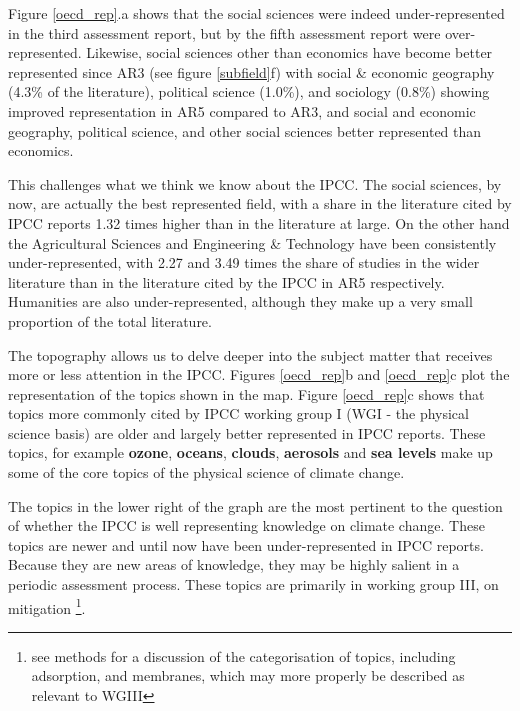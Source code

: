 \documentclass{article}
\begin{document}
\begin{linenumbers}
		Figure \ref{oecd_rep}.a shows that the social sciences were indeed under-represented in the third assessment report, but by the fifth assessment report were over-represented. Likewise, social sciences other than economics have become better represented since AR3  (see figure \ref{subfield}f) with social \& economic geography (4.3\% of the literature), political science (1.0\%), and sociology (0.8\%) showing improved representation in AR5 compared to AR3, and social and economic geography, political science, and other social sciences better represented than economics. 
		
		This challenges what we think we know about the IPCC. The social sciences, by now, are actually the best represented field, with a share in the literature cited by IPCC reports 1.32 times higher than in the literature at large.  On the other hand the Agricultural Sciences and Engineering \& Technology have been consistently under-represented, with 2.27 and 3.49 times the share of studies in the wider literature than in the literature cited by the IPCC in AR5 respectively. Humanities are also under-represented, although they make up a very small proportion of the total literature.
		
		
		The topography allows us to delve deeper into the subject matter that receives more or less attention in the IPCC. Figures \ref{oecd_rep}b and \ref{oecd_rep}c plot the representation of the topics shown in the map. Figure \ref{oecd_rep}c shows that topics more commonly cited by IPCC working group I (WGI - the physical science basis) are older and largely better represented in IPCC reports. These topics, for example \textbf{ozone}, \textbf{oceans}, \textbf{clouds}, \textbf{aerosols} and \textbf{sea levels} make up some of the core topics of the physical science of climate change.
		
		The topics in the lower right of the graph are the most pertinent to the question of whether the IPCC is well representing knowledge on climate change. These topics are newer and until now have been under-represented in IPCC reports. Because they are new areas of knowledge, they may be highly salient in a periodic assessment process. These topics are primarily in working group III, on mitigation \footnote{see methods for a discussion of the categorisation of topics, including adsorption, and membranes, which may more properly be described as relevant to WGIII}.
		

\end{linenumbers}
\end{document}

